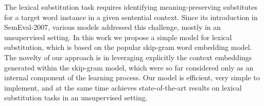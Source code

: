 The lexical substitution task requires identifying meaning-preserving substitutes for a target word instance in a given sentential context. Since its introduction in SemEval-2007, various models addressed this challenge, mostly in an unsupervised setting. In this work we propose a simple model for lexical substitution, which is based on the popular skip-gram word embedding model. The novelty of our approach is in leveraging explicitly the context embeddings generated within the skip-gram model, which were so far considered only as an internal component of the learning process. Our model is efficient, very simple to implement, and at the same time achieves state-of-the-art results on lexical substitution tasks in an unsupervised setting.
